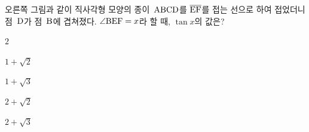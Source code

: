 \noindent\begin{minipage}[t]{0.58\linewidth}\vspace{0pt}\raggedright 오른쪽 그림과 같이 직사각형 모양의 종이~$\mathrm{ABCD}$를 $\overline{\mathrm{EF}}$를 접는 선으로 하여 접었더니 점~$\mathrm{D}$가 점~$\mathrm{B}$에 겹쳐졌다. $\angle\mathrm{BEF}=x$라 할 때, $\tan x$의 값은?\end{minipage}\hfill\begin{minipage}[t]{0.4\linewidth}\vspace{0pt}\centering \resizebox{\ifdim\width>\linewidth\linewidth\else\width\fi}{!}{}\end{minipage}\par
\begin{choices32}{\rule[-3ex]{0pt}{8ex}$2$}{\rule[-3ex]{0pt}{8ex}$1+\sqrt{2}$}{\rule[-3ex]{0pt}{8ex}$1+\sqrt{3}$}{\rule[-3ex]{0pt}{8ex}$2+\sqrt{2}$}{\rule[-3ex]{0pt}{8ex}$2+\sqrt{3}$}\end{choices32}
